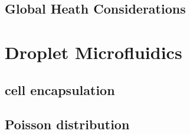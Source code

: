 \subsection{Global Heath Considerations}

\section{Droplet Microfluidics}

\subsection{cell encapsulation}

\subsection{Poisson distribution}





